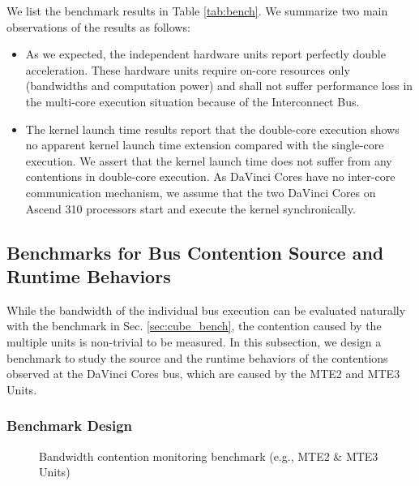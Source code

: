 \documentclass[12pt]{extbook}
\begin{document}
We list the benchmark results in Table \ref{tab:bench}. We summarize two main observations of the results as follows:

\begin{itemize}
    \item As we expected, the independent hardware units report perfectly double acceleration. These hardware units require on-core resources only (bandwidths and computation power) and shall not suffer performance loss in the multi-core execution situation because of the Interconnect Bus.
    
    \item The kernel launch time results report that the double-core execution shows no apparent kernel launch time extension compared with the single-core execution. We assert that the kernel launch time does not suffer from any contentions in double-core execution. As DaVinci Cores have no inter-core communication mechanism, we assume that the two DaVinci Cores on Ascend 310 processors start and execute the kernel synchronically.
\end{itemize}


\subsection{Benchmarks for Bus Contention Source and Runtime Behaviors}

While the bandwidth of the individual bus execution can be evaluated naturally with the benchmark in Sec. \ref{sec:cube_bench}, the contention caused by the multiple units is non-trivial to be measured. In this subsection, we design a benchmark to study the source and the runtime behaviors of the contentions observed at the DaVinci Cores bus, which are caused by the MTE2 and MTE3 Units. 

\subsubsection{Benchmark Design \label{sec:ben_des}}

\begin{figure}[tbp]
    \caption{Bandwidth contention monitoring benchmark (e.g., MTE2 \& MTE3 Units)}
    \label{fig:bench_meth}
    \end{figure}
\end{document}

